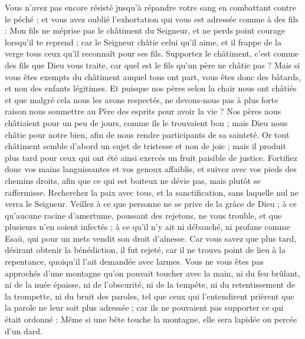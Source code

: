 \begin{multicols}{2}
Vous n'avez pas encore résisté jusqu'à répandre votre sang en combattant contre le péché ;
et vous avez oublié l'exhortation qui vous est adressée comme à des fils : Mon fils ne méprise pas le châtiment du Seigneur, et ne perds point courage lorsqu’il te reprend ;
car le Seigneur châtie celui qu'il aime, et il frappe de la verge tous ceux qu’il reconnaît pour ses fils.
Supportez le châtiment, c’est comme des fils que Dieu vous traite, car quel est le fils qu’un père ne châtie pas ?
Mais si vous êtes exempts du châtiment auquel tous ont part, vous êtes donc des bâtards, et non des enfants légitimes.
Et puisque nos pères selon la chair nous ont châtiés et que malgré cela nous les avons respectés, ne devons-nous pas à plus forte raison nous soumettre au Père des esprits pour avoir la vie ?
Nos pères nous châtiaient pour un peu de jours, comme ils le trouvaient bon ; mais Dieu nous châtie pour notre bien, afin de nous rendre participants de sa sainteté.
Or tout châtiment semble d’abord un sujet de tristesse et non de joie ; mais il produit plus tard pour ceux qui ont été ainsi exercés un fruit paisible de justice.
Fortifiez donc vos mains languissantes et vos genoux affaiblis,
et suivez avec vos pieds des chemins droits, afin que ce qui est boiteux ne dévie pas, mais plutôt se raffermisse.
Recherchez la paix avec tous, et la sanctification, sans laquelle nul ne verra le Seigneur.
Veillez à ce que personne ne se prive de la grâce de Dieu ; à ce qu’aucune racine d'amertume, poussant des rejetons, ne vous trouble, et que plusieurs n’en soient infectés ;
à ce qu’il n’y ait ni débauché, ni profane comme Esaü, qui pour un mets vendit son droit d’aînesse.
Car vous savez que plus tard, désirant obtenir la bénédiction, il fut rejeté, car il ne trouva point de lieu à la repentance, quoiqu'il l’ait demandée avec larmes.
Vous ne vous êtes pas approchés d’une montagne qu’on pouvait toucher avec la main, ni du feu brûlant, ni de la nuée épaisse, ni de l'obscurité, ni de la tempête,
ni du retentissement de la trompette, ni du bruit des paroles, tel que ceux qui l'entendirent prièrent que la parole ne leur soit plus adressée ;
car ils ne pouvaient pas supporter ce qui était ordonné : Même si une bête touche la montagne, elle sera lapidée ou percée d'un dard.

\end{multicols}
